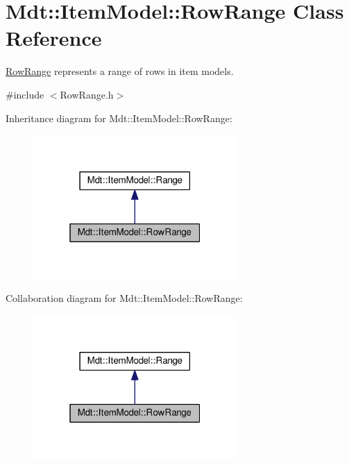 \hypertarget{class_mdt_1_1_item_model_1_1_row_range}{}\section{Mdt\+:\+:Item\+Model\+:\+:Row\+Range Class Reference}
\label{class_mdt_1_1_item_model_1_1_row_range}


\hyperlink{class_mdt_1_1_item_model_1_1_row_range}{Row\+Range} represents a range of rows in item models.  




{\ttfamily \#include $<$Row\+Range.\+h$>$}



Inheritance diagram for Mdt\+:\+:Item\+Model\+:\+:Row\+Range\+:\nopagebreak
\begin{figure}[H]
\begin{center}
\leavevmode
\includegraphics[width=220pt]{class_mdt_1_1_item_model_1_1_row_range__inherit__graph}
\end{center}
\end{figure}


Collaboration diagram for Mdt\+:\+:Item\+Model\+:\+:Row\+Range\+:\nopagebreak
\begin{figure}[H]
\begin{center}
\leavevmode
\includegraphics[width=220pt]{class_mdt_1_1_item_model_1_1_row_range__coll__graph}
\end{center}
\end{figure}
